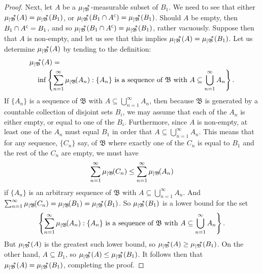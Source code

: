 \documentclass[
twoside=true,
paper=letter,
fontsize=9pt,
pagesize=auto,
leqno,
openany,
headsepline,
overfullrule,
]{scrbook}
\theoremstyle{plain}
\theoremstyle{plain}
\theoremstyle{definition}
\theoremstyle{bfnoteitalic}
\theoremstyle{bfnoteroman}
\newcommand{\sigalg}[1]{\mathfrak{#1}}
\newcommand{\restrictedto}[1]{_{\lvert#1}\kern-1.5pt}
\newcommand{\comp}{^{\hbox{\tiny{$\mathsf C$}}}}
\newcommand{\meets}{\cap}
\newcommand{\sigmaalgebraii}{\sigalg{B}}
\newcommand{\Psubstar}[1]{\measure\restrictedto{#1}\kern-2pt^*}
\newcommand{\sigalgb}{\sigmaalgebraii}
\newcommand{\measure}{\mu}
\begin{document}
\begin{proof}
Next, let $A$ be a $\Psubstar{\sigalgb}$-measurable subset of $B_1$. We need to see that either $\Psubstar{\sigalgb}(A) = \Psubstar{\sigalgb}(B_1)$,
or 
$\Psubstar{\sigalgb}(B_1\meets A\comp) = \Psubstar{\sigalgb}(B_1)$. Should $A$ be empty, then $B_1\meets A\comp = B_1$, and so 
$\Psubstar{\sigalgb}(B_1\meets A\comp) = \Psubstar{\sigalgb}(B_1)$, rather vacuously.
Suppose then that $A$ is non-empty, and let us see that this implies 
$\Psubstar{\sigalgb}(A) = \Psubstar{\sigalgb}(B_1)$.
Let us determine $\Psubstar{\sigalgb}(A)$ by tending to the definition:
\begin{align*}
& \Psubstar{\sigalgb}(A) = \\
& \quad \inf \left\{
\sum_{n=1}^{\infty}
\measure\restrictedto{\sigalgb}(A_n) : 
\text{$\{A_n\}$ is a sequence of $\sigalgb$ with $A\subseteq\bigcup_{n=1}^{\infty} A_n$}
\right\}.
\end{align*}
If $\{A_n\}$ is a sequence of $\sigalgb$ with $A\subseteq\bigcup_{n=1}^{\infty} A_n$, then because $\sigalgb$ is generated by a countable collection of disjoint sets $B_i$, we may assume that each of the $A_n$ is either empty, or equal to one of the $B_i$. Furthermore, since $A$ is non-empty, at least one of the $A_n$ must equal $B_1$ in order that $A\subseteq\bigcup_{n=1}^{\infty} A_n$. This means that for any sequence, $\{C_n\}$ say, of $\sigalgb$ where exactly one of the $C_n$ is equal to $B_1$ and the rest of the $C_n$ are empty, we must have 
\[
\sum_{n=1}^{\infty}
\measure\restrictedto{\sigalgb}(C_n)
\leq 
\sum_{n=1}^{\infty}
\measure\restrictedto{\sigalgb}(A_n)
\]
if $\{A_n\}$ is an arbitrary sequence of $\sigalgb$ with $A\subseteq\bigcup_{n=1}^{\infty} A_n$. And
$\sum_{n=1}^{\infty}
\measure\restrictedto{\sigalgb}(C_n) 
=\measure\restrictedto{\sigalgb}(B_1) 
= \Psubstar{\sigalgb}(B_1)$. So
$\Psubstar{\sigalgb}(B_1)$ is a lower bound for the set
\[
\left\{
\sum_{n=1}^{\infty}
\measure\restrictedto{\sigalgb}(A_n) : 
\text{$\{A_n\}$ is a sequence of $\sigalgb$ with $A\subseteq\bigcup_{n=1}^{\infty} A_n$}
\right\}.
\]
But $\Psubstar{\sigalgb}(A)$ is the greatest such lower bound, so 
$\Psubstar{\sigalgb}(A) 
\geq 
\Psubstar{\sigalgb}(B_1)$.
On the other hand, $A\subseteq B_1$, so $\Psubstar{\sigalgb}(A) 
\leq 
\Psubstar{\sigalgb}(B_1)$.
It follows then that $\Psubstar{\sigalgb}(A) 
= 
\Psubstar{\sigalgb}(B_1)$, completing the proof.
\end{proof}
\end{document}
